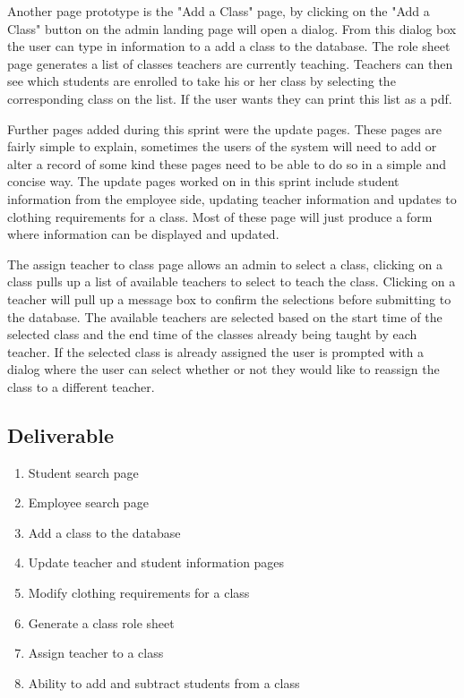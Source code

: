 Another page prototype is the "Add a Class" page, by clicking on the "Add a Class" button on the admin landing page will open a dialog. From this dialog box the user can type in information to a add a class to the database. The role sheet page generates a list of classes teachers are currently teaching. Teachers can then see which students are enrolled to take his or her class by selecting the corresponding class on the list. If the user wants they can print this list as a pdf.

Further pages added during this sprint were the update pages. These pages are fairly simple to explain, sometimes the users of the system will need to add or alter a record of some kind these pages need to be able to do so in a simple and concise way. The update pages worked on in this sprint include student information from the employee side, updating teacher information and updates to clothing requirements for a class. Most of these page will just produce a form where information can be displayed and updated.

The assign teacher to class page allows an admin to select a class, clicking on a class pulls up a list of available teachers to select to teach the class. Clicking on a teacher will pull up a message box to confirm the selections before submitting to the database. The available teachers are selected based on the start time of the selected class and the end time of the classes already being taught by each teacher. If the selected class is already assigned the user is prompted with a dialog where the user can select whether or not they would like to reassign the class to a different teacher.\\



\subsection{Deliverable}

\begin{enumerate}
\item Student search page 
\item Employee search page
\item Add a class to the database
\item Update teacher and student information pages
\item Modify clothing requirements for a class
\item Generate a class role sheet
\item Assign teacher to a class
\item Ability to add and subtract students from a class  
\end{enumerate}

